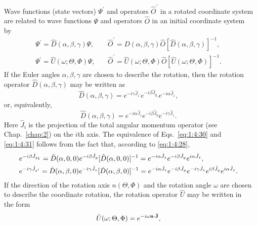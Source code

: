 Wave functions (state vectors) \(\Psi^{\prime}\) and operators \(\widehat{O}^{\prime}\) in a rotated coordinate system are related to wave functions \(\Psi\) and operators \(\hat{O}\) in an initial coordinate system by
\begin{align}
\Psi^{\prime}=\widehat{D}(\alpha, \beta, \gamma) \Psi, &\quad \widehat{O}^{\prime}=\widehat{D}(\alpha, \beta, \gamma) \widehat{O}[\widehat{D}(\alpha, \beta, \gamma)]^{-1}  ,\label{eq:1:4:28}\\
\Psi^{\prime}=\widehat{U}(\omega ; \Theta, \Phi) \Psi, &\quad \widehat{O}^{\prime}=\widehat{U}(\omega ; \Theta, \Phi) \widehat{O}[\widehat{U}(\omega ; \Theta, \Phi)]^{-1} . \label{eq:1:4:29}
\end{align}
If the Euler angles \(\alpha, \beta, \gamma\) are chosen to describe the rotation, then the rotation operator \(\widehat{D}(\alpha, \beta, \gamma)\) may be written as
\begin{equation}
\widehat{D}(\alpha, \beta, \gamma)=e^{-i \gamma \hat{J}_{z^{\prime}}} e^{-i \beta \hat{J}_{y_{1}}} e^{-i \alpha \hat{J}_{z}}, \label{eq:1:4:30}
\end{equation}
or, equivalently,
\begin{equation}
\hat{D}(\alpha, \beta, \gamma)=e^{-i \alpha \hat{J}_{z}} e^{-i \beta \hat{J}_{y}} e^{-i \gamma \hat{J}_{z}} .\label{eq:1:4:31}
\end{equation}
Here \(\widehat{J}_{i}\) is the projection of the total angular momentum operator (see Chap.~\ref{chap:2}) on the \(i\)th axis. The equivalence of Eqs.~\eqref{eq:1:4:30} and \eqref{eq:1:4:31} follows from the fact that, according to \eqref{eq:1:4:28},
\begin{align}
& e^{-i \beta \hat{J}_{y_{1}}}=\hat{D}(\alpha, 0,0) e^{-i \beta \hat{J}_{y}}[\hat{D}(\alpha, 0,0)]^{-1}=e^{-i \alpha \hat{J}_{z}} e^{-i \beta \hat{J}_{y}} e^{i \alpha \hat{J}_{z}} , \label{eq:1:4:32}\\
& e^{-i \gamma \hat{J}_{z^{\prime}}}=\hat{D}(\alpha, \beta, 0) e^{-i \gamma \hat{J}_{z}}[\hat{D}(\alpha, \beta, 0)]^{-1}=e^{-i \alpha \hat{J}_{z}} e^{-i \beta \hat{J}_{y}} e^{-i \gamma \hat{J}_{z}} e^{i \beta \hat{J}_{y}} e^{i \alpha \hat{J}_{z}} .\notag
\end{align}
If the direction of the rotation axis \(n(\Theta, \Phi)\) and the rotation angle \(\omega\) are chosen to describe the coordinate rotation, the rotation operator \(\hat{U}\) may be written in the form
\begin{equation}
\hat{U}(\omega ; \Theta, \Phi)=e^{-i \omega \mathbf{n} \cdot \hat{\mathbf{J}}}, \label{eq:1:4:33}
\end{equation}
